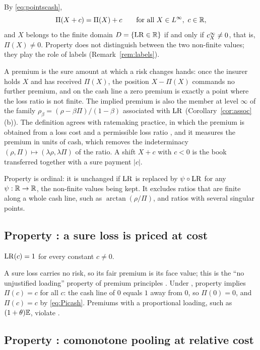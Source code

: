 By \eqref{eq:pointscash},
\begin{equation}\label{eq:Picash}
 \Pi(X+c)=\Pi(X)+c\qquad\text{for all }X\in L^\infty,\ c\in\mathbb R ,
\end{equation}
and $X$ belongs to the finite domain $D=\{\mathrm{LR}\in\mathbb R\}$ if and only if $c^{\infty}_{X}\neq0$, that is, $\Pi(X)\neq0$. Property \axP{} does not
distinguish between the two non-finite values; they play the role of labels (Remark~\ref{rem:labels}).

A premium is the sure amount at which a risk changes hands: once the insurer holds $X$ and has received $\Pi(X)$,
the position $X-\Pi(X)$ commands no further premium, and on the cash line a zero premium is exactly a point where
the loss ratio is not finite. The implied premium is also the member at level $\infty$ of the family
$\rho_\beta=(\rho-\beta\Pi)/(1-\beta)$ associated with $\mathrm{LR}$ (Corollary~\ref{cor:assoc}(b)). The definition agrees
with ratemaking practice, in which the premium is obtained from a loss cost and a permissible loss ratio
\citep{wernermodlin2016}, and it measures the premium in units of cash, which removes the indeterminacy
$(\rho,\Pi)\mapsto(\lambda\rho,\lambda\Pi)$ of the ratio. A shift $X+c$ with $c<0$ is the book transferred together
with a sure payment $|c|$.

Property \axP{} is ordinal: it is unchanged if $\mathrm{LR}$ is replaced by $\psi\circ\mathrm{LR}$ for any $\psi:\mathbb R\to\mathbb R$, the
non-finite values being kept. It excludes ratios that are finite along a whole cash line, such as
$\arctan(\rho/\Pi)$, and ratios with several singular points.

\subsection{Property \axN: a sure loss is priced at cost}

\begin{property}[\axN]\label{ax:N}
$\mathrm{LR}(c)=1$ for every constant $c\neq0$.
\end{property}

A sure loss carries no risk, so its fair premium is its face value; this is the ``no unjustified loading''
property of premium principles \citep{gerber1974}. Under \axP{}, property \axN{} implies $\Pi(c)=c$ for all $c$:
the cash line of $0$ equals $1$ away from $0$, so $\Pi(0)=0$, and $\Pi(c)=c$ by \eqref{eq:Picash}. Premiums
with a proportional loading, such as $(1+\theta)\mathbb E$, violate \axN.

\subsection{Property \axCM: comonotone pooling at relative cost}\label{sec:cm}

